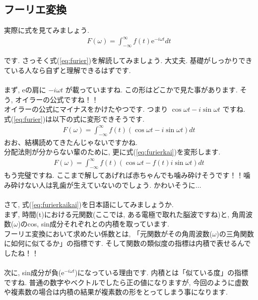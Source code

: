 \documentclass[11pt,a4paper]{jreport}
\begin{document}
\subsection{フーリエ変換} 
実際に式を見てみましょう.\\
\begin{eqnarray}
F(\omega) = \int_{-\infty}^{\infty} f(t)\mathrm{e}^{-i\omega t} dt
\label{eq:furier}
\end{eqnarray}

です. さっそく式(\ref{eq:furier})を解読してみましょう. 大丈夫. 基礎がしっかりできている人なら自ずと理解できるはずです.\\
\\
まず, eの肩に $ -i\omega t $ が載っていますね. この形はどこかで見た事があります. そう, オイラーの公式ですね！！\\
オイラーの公式にマイナスをかけたやつです. つまり $ \cos\omega t  - i\sin\omega t $ ですね. \\
式(\ref{eq:furier})は以下の式に変形できそうです.\\
\begin{eqnarray}
F(\omega) = \int_{-\infty}^{\infty} f(t)(\cos\omega t - i\sin\omega t) dt
\label{eq:furierkai}
\end{eqnarray}
おお、結構読めてきたんじゃないですかね.\\
分配法則が分からない輩のために, 更に式(\ref{eq:furierkai})を変形します.\\
\begin{eqnarray}
F(\omega) = \int_{-\infty}^{\infty} f(t)(\cos\omega t - f(t)i\sin\omega t) dt
\label{eq:furierkaikai}
\end{eqnarray}
もう完璧ですね. ここまで解してあげれば赤ちゃんでも噛み砕けそうです！！噛み砕けない人は乳歯が生えていないのでしょう. かわいそうに...\\
\\
さて, 式(\ref{eq:furierkaikai})を日本語にしてみましょうか.\\
まず, 時間(t)における元関数(ここでは, ある電極で取れた脳波ですね)と, 角周波数($\omega$)のcos, sin成分それぞれとの内積を取っています. 
\\
フーリエ変換において求めたい係数とは, 「元関数がその角周波数($\omega$)の三角関数に如何に似てるか」の指標です. そして関数の類似度の指標は内積で表せるんでしたね！！\\
\\
次に, sin成分が負($\mathrm{e}^{-i\omega t}$)になっている理由です. 内積とは「似ている度」の指標ですね. 普通の数字やベクトルでしたら正の値になりますが, 今回のように虚数や複素数の場合は内積の結果が複素数の形をとってしまう事になります.\\
\end{document}
